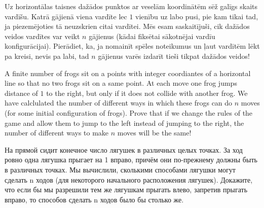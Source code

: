 

%



\renewcommand{\theenumi}{\alph{enumi}}



\noindent
 
\filbreak


\begin{problem}

Uz horizontālas taisnes dažādos punktos ar veselām koordinātēm sēž galīgs skaits vardīšu. Katrā gājienā viena vardīte lec $1$ vienību uz labo pusi, pie kam tikai tad, ja piezemējoties tā neuzskrien citai vardītei. Mēs esam saskaitījuši, cik dažādos veidos vardītes var veikt $n$ gājienus (kādai fiksētai sākotnējai vardīu konfigurācijai). Pierādiet, ka, ja nomainīt spēles noteikumus un ļaut vardītēm lēkt pa kreisi, nevis pa labi, tad $n$ gājienus varēs izdarīt tieši tikpat dažādos veidos!  


A finite number of frogs sit on a points with integer coordiantes of a horizontal line so that no two frogs sit on a same point. At each move one frog jumps distance of $1$ to the right, but only if it does not collide with another frog. We have calclulated the number of different ways in which these frogs can do $n$ moves (for some initial configuration of frogs). Prove that if we change the rules of the game and allow them to jump to the left instead of jumping to the right, the number of different ways to make $n$ moves will be the same! 
 
 
На прямой сидит конечное число лягушек в различных целых точках. За ход ровно одна лягушка прыгает на 1 вправо, причём они по-прежнему должны быть в различных точках. Мы вычислили, сколькими способами лягушки могут сделать n ходов (для некоторого начального расположения лягушек). Докажите, что если бы мы разрешили тем же лягушкам прыгать влево, запретив прыгать вправо, то способов сделать n ходов было бы столько же.

\end{problem}

